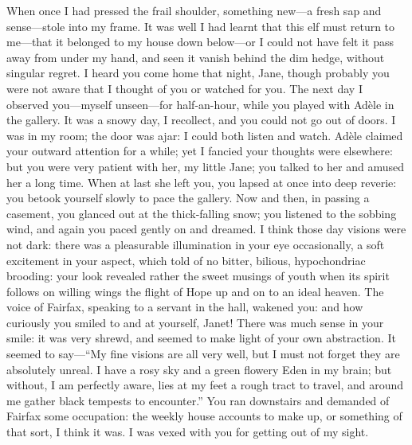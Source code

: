 {%
When once I had pressed the frail shoulder, something new---a fresh
sap and sense---stole into my frame. It was well I had learnt that this
elf must return to me---that it belonged to my house down below---or I
could not have felt it pass away from under my hand, and seen it vanish
behind the dim hedge, without singular regret. I heard you come home
that night, Jane, though probably you were not aware that I thought of
you or watched for you. The next day I observed you---myself
unseen---for half-an-hour, while you played with Adèle in the gallery. 
It was a snowy day, I recollect, and you could not go out of doors. I
was in my room; the door was ajar: I could both listen and watch. Adèle
claimed your outward attention for a while; yet I fancied your thoughts
were elsewhere: but you were very patient with her, my little Jane; you
talked to her and amused her a long time. When at last she left you,
you lapsed at once into deep reverie: you betook yourself slowly to pace
the gallery. Now and then, in passing a casement, you glanced out at
the thick-falling snow; you listened to the sobbing wind, and again you
paced gently on and dreamed. I think those day visions were not dark:
there was a pleasurable illumination in your eye occasionally, a soft
excitement in your aspect, which told of no bitter, bilious,
hypochondriac brooding: your look revealed rather the sweet musings of
youth when its spirit follows on willing wings the flight of Hope up and
on to an ideal heaven. The voice of \Mrs{} Fairfax, speaking to a servant
in the hall, wakened you: and how curiously you smiled to and at
yourself, Janet! There was much sense in your smile: it was very
shrewd, and seemed to make light of your own abstraction. It seemed to
say---\enquote{My fine visions are all very well, but I must not forget they are
absolutely unreal. I have a rosy sky and a green flowery Eden in my
brain; but without, I am perfectly aware, lies at my feet a rough tract
to travel, and around me gather black tempests to encounter.} You ran
downstairs and demanded of \Mrs{} Fairfax some occupation: the weekly
house accounts to make up, or something of that sort, I think it was. I
was vexed with you for getting out of my sight.

}
